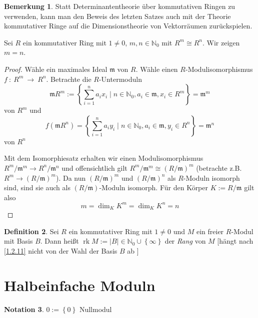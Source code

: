 \documentclass[
twoside=semi,
fontsize=12,
DIV=12, 
cleardoublepage=current,
leqno,
headings=optiontoheadandtoc, 
toc=idx
]{scrbook}
\newcommand{\N}{\mathbb{N}}
\newcommand{\set}[1]{\left\{ #1 \right\}}
\DeclareMathOperator{\rk}{rk}
\theoremstyle{definition}
\newtheorem{definition}{Definition}[section]
\newtheorem{bemerkung}[definition]{Bemerkung}
\newtheorem{notation}[definition]{Notation}
\begin{document}
	\begin{bemerkung}\label{1.2.12}\hfill\newline
		Statt Determinantentheorie \"uber kommutativen Ringen zu verwenden, kann man den Beweis des letzten Satzes auch mit der Theorie kommutativer Ringe auf die Dimensionstheorie von Vektorr\"aumen zur\"uckspielen. 
		
		\noindent Sei $R$ ein kommutativer Ring mit $1 \neq 0$, $m, n\in \N_0$ mit $R^m \cong R^n$. Wir zeigen $m = n$.
		
		\begin{proof}
			W\"ahle ein maximales Ideal $\mathfrak{m}$ von $R$. W\"ahle einen $R$-Modulisomorphismus $f~:~R^m~\to~R^n$. Betrachte die $R$-Untermoduln
			\[\mathfrak{m}R^m := \set{\sum_{i=1}^n a_ix_i \mid n \in \N_0, a_i \in \mathfrak{m}, x_i \in R^m} = \mathfrak{m}^m\]
			von $R^m$ und 
			\[f(\mathfrak{m}R^n) = \set{\sum_{i=1}^n a_iy_i \mid n \in \N_0, a_i \in \mathfrak{m}, y_i \in R^n} = \mathfrak{m}^n\]
			von $R^n$
			
			\noindent Mit dem Isomorphiesatz erhalten wir einen Modulisomorphismus $R^m/\mathfrak{m}^m \to R^n/\mathfrak{m}^n$ und offensichtlich gilt $R^m/\mathfrak{m}^m  \cong (R/\mathfrak{m})^m$ (betrachte z.B. $R^m \to (R/\mathfrak{m})^m$).\newline
			Da nun $(R/\mathfrak{m})^m$ und $(R/\mathfrak{m})^n$ als $R$-Moduln isomorph sind, sind sie auch als \linebreak $(R/\mathfrak{m})$-Moduln isomorph. F\"ur den K\"orper $K:= R/\mathfrak{m}$ gilt also 
			\[m = \dim_K K^m = \dim_K K^n = n\]
		\end{proof}
	\end{bemerkung}

	\begin{definition}\label{1.2.13}\hfill\newline
		Sei $R$ ein kommutativer Ring mit $1 \neq 0$ und $M$ ein freier $R$-Modul mit Basis $B$. Dann hei\ss t $\rk M := |B| \in \N_0 \cup \set{\infty}$ der \emph{Rang} von $M$ [h\"angt nach \ref{1.2.11} nicht von der Wahl der Basis $B$ ab ]
	\end{definition}
	
	
	\newpage
	
	\section{Halbeinfache Moduln}\thispagestyle{sectionstart}
	\begin{notation}\label{1.3.1}\hfill\newline
		$0 := \set{0}$ Nullmodul
	\end{notation}
	
\end{document}
